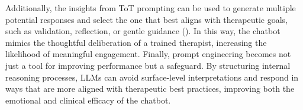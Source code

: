 Additionally, the insights from ToT prompting can be used to generate multiple potential responses and select the one that best aligns with therapeutic goals, such as validation, reflection, or gentle guidance (\cite{yao2023tree}). In this way, the chatbot mimics the thoughtful deliberation of a trained therapist, increasing the likelihood of meaningful engagement.
Finally, prompt engineering becomes not just a tool for improving performance but a safeguard. By structuring internal reasoning processes, LLMs can avoid surface-level interpretations and respond in ways that are more aligned with therapeutic best practices, improving both the emotional and clinical efficacy of the chatbot.